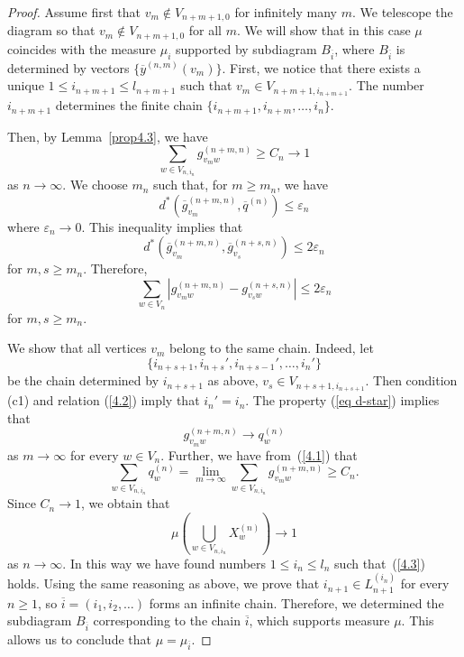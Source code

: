 \documentclass[11pt, english, reqno]{amsart}
\theoremstyle{definition}
\theoremstyle{remark}
\theoremstyle{plain}
\def\ov{\overline}
\numberwithin{equation}{section}
\begin{document}
{\begin{proof}
Assume first that $v_m \notin V_{n+m+1,0}$ for infinitely many $m$. We
telescope the diagram so that $v_m \notin V_{n+m+1,0}$ for all $m$. We
will show that in this case $\mu$ coincides with the measure $\mu_i$
supported by subdiagram $B_{\ov i}$, where $B_{\ov i}$ is determined by
vectors $\{\ov y^{(n,m)}(v_m)\}$. First, we notice that there exists
a unique $1
\leq i_{n+m+1} \leq l_{n+m+1}$ such that $v_m \in V_{n+m+1, i_{n+m+1}}
$. The number $i_{n+m+1}$ determines the finite
 chain $\{i_{n+m+1}, i_{n+m}, \ldots, i_n\}$.

Then, by Lemma~\ref{prop4.3}, we have
\begin{equation}\label{4.1}
\sum_{w \in V_{n, i_n}} g_{v_m w}^{(n+m,n)} \geq C_n \rightarrow 1
\end{equation}
as $n \rightarrow \infty$. We choose $m_n$ such that,
for $m \geq m_n$, we have
\begin{equation}\label{eq d-star}
d^{*}(\ov g_{v_m}^{(n+m,n)}, \ov q^{(n)}) \leq \varepsilon_n
\end{equation}
 where $\varepsilon_n  \rightarrow 0$. This inequality implies that
$$
d^{*}(\ov g_{v_m}^{(n+m,n)}, \ov g_{v_s}^{(n+s,n)}) \leq 2 \varepsilon_n
$$
for $m,s \geq m_n$. %
Therefore,
\begin{equation}\label{4.2}
\sum_{w \in V_n}\left|g_{v_m w}^{(n+m,n)} - g_{v_s w}^{(n+s,n)}\right| \leq 2
\varepsilon_n
\end{equation}
for $m,s \geq m_n$.

We show that all vertices $v_m$ belong to the same chain.
Indeed, let 
$$
\{i_{n+s+1},i_{n+s}', i_{n+s-1}', \ldots, i_n'\}
$$
be the chain
determined by $i_{n+s+1}$ as above, $v_s \in V_{n+s+1, i_{n+s+1}}$.
Then condition (c1) and relation (\ref{4.2}) imply that $i_n' = i_n$. The
 property (\ref{eq d-star})  implies that
 $$
 g_{v_m w}^{(n+m,n)} \rightarrow q^{(n)}_w
 $$
 as $m \rightarrow \infty$ for every $w \in V_n$. Further,
we have from~(\ref{4.1}) that
$$
\sum_{w \in V_{n, i_n}} q^{(n)}_w = \lim_{m \rightarrow \infty}\sum_{w \in
V_{n, i_n}}g_{v_m w}^{(n+m,n)} \geq C_n.
$$
Since $C_n \rightarrow 1$, we obtain that
\begin{equation}\label{4.3}
\mu\left(\bigcup_{w \in V_{n, i_n}} X_w^{(n)}\right) \rightarrow 1
\end{equation}
as $n\rightarrow \infty$.
In this way we have found numbers $1 \leq i_n \leq l_n$ such
that~(\ref{4.3}) holds.
Using the same reasoning as above, we prove that $i_{n+1} \in
L_{n+1}^{(i_n)}$ for every $n \geq 1$, so $\ov i = (i_1, i_2, \ldots)$ forms
an infinite chain.
Therefore, we determined the subdiagram $B_{\ov i}$ corresponding to the
 chain $\ov i$, which supports measure $\mu$.
This allows us to conclude that $\mu = \mu_{\ov i}$.


\end{proof}}
\end{document}
